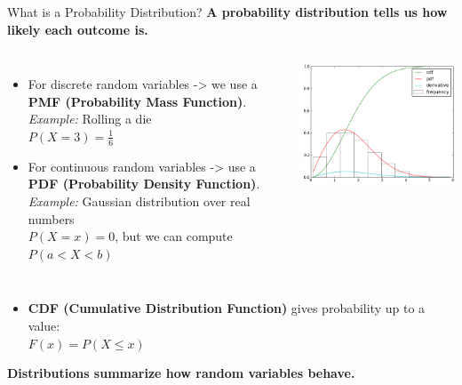 \documentclass[handout,aspectratio=169]{beamer}
\begin{document}
\begin{frame}{What is a Probability Distribution?}
	\textbf{A probability distribution tells us how likely each outcome is.}
	\begin{columns}
		\begin{itemize}
			\item For discrete random variables -> we use a \textbf{PMF (Probability Mass Function)}. \textit{Example:} Rolling a die \\
			      \quad $P(X=3) = \frac{1}{6}$
			\item For continuous random variables -> use a \textbf{PDF (Probability Density Function)}. \textit{Example:} Gaussian distribution over real numbers\\
			      \quad $P(X = x) = 0$, but we can compute $P(a < X < b)$
			                      
		\end{itemize}
		              
		\includegraphics[width=\linewidth]{chapter_figs/01_figs/probability_distribution.png}
	\end{columns}
	    
	\begin{itemize}
		\item \textbf{CDF (Cumulative Distribution Function)} gives probability up to a value:\\
		      \quad $F(x) = P(X \leq x)$
	\end{itemize}
	\vspace{0.5em}
	\textbf{Distributions summarize how random variables behave.}
\end{frame}
\end{document}
